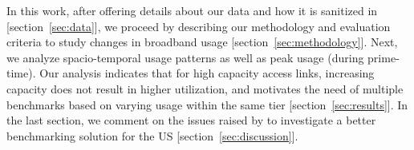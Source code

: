 In this work, after offering details about our data and how it is sanitized in 
[section~\ref{sec:data}], we proceed by describing our methodology and evaluation criteria to study
changes in broadband usage [section~\ref{sec:methodology}]. Next, we analyze spacio-temporal
usage patterns as well as peak usage (during prime-time). Our analysis indicates that for high
capacity access links, increasing capacity does not result in higher utilization, and
motivates the need of multiple benchmarks based on varying usage within the same tier
[section~\ref{sec:results}]. In the last section, we comment on the issues 
raised by \FCC to investigate a better benchmarking solution for the US 
[section~\ref{sec:discussion}].





